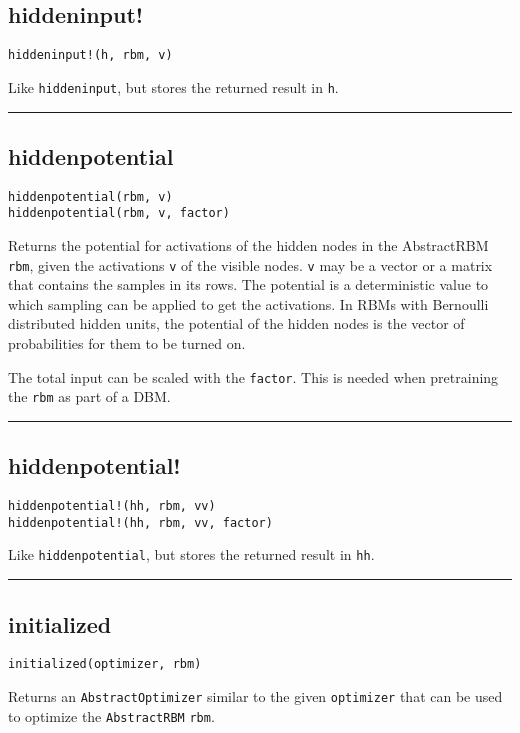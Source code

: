 \subsection*{hiddeninput!}
\begin{verbatim}
hiddeninput!(h, rbm, v)
\end{verbatim}
Like \texttt{hiddeninput}, but stores the returned result in \texttt{h}.

\noindent\rule{\textwidth}{1pt}
\subsection*{hiddenpotential}
\begin{verbatim}
hiddenpotential(rbm, v)
hiddenpotential(rbm, v, factor)
\end{verbatim}
Returns the potential for activations of the hidden nodes in the AbstractRBM \texttt{rbm}, given the activations \texttt{v} of the visible nodes. \texttt{v} may be a vector or a matrix that contains the samples in its rows. The potential is a deterministic value to which sampling can be applied to get the activations. In RBMs with Bernoulli distributed hidden units, the potential of the hidden nodes is the vector of probabilities for them to be turned on.

The total input can be scaled with the \texttt{factor}. This is needed when pretraining the \texttt{rbm} as part of a DBM.

\noindent\rule{\textwidth}{1pt}
\subsection*{hiddenpotential!}
\begin{verbatim}
hiddenpotential!(hh, rbm, vv)
hiddenpotential!(hh, rbm, vv, factor)
\end{verbatim}
Like \texttt{hiddenpotential}, but stores the returned result in \texttt{hh}.

\noindent\rule{\textwidth}{1pt}
\subsection*{initialized}
\begin{verbatim}
initialized(optimizer, rbm)
\end{verbatim}
Returns an \texttt{AbstractOptimizer} similar to the given \texttt{optimizer} that can be used to optimize the \texttt{AbstractRBM} \texttt{rbm}.

